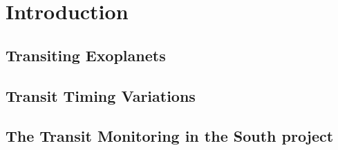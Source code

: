\chapter{Introduction}\label{chap:intro}

\section{Transiting Exoplanets}

\section{Transit Timing Variations}

\section{The Transit Monitoring in the South project}